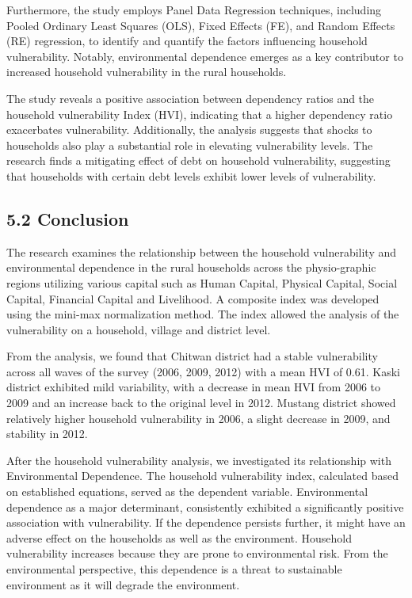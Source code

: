 Furthermore, the study employs Panel Data Regression techniques, including Pooled Ordinary Least Squares (OLS), Fixed Effects (FE), and Random Effects (RE) regression, to identify and quantify the factors influencing household vulnerability. Notably, environmental dependence emerges as a key contributor to increased household vulnerability in the rural households.

The study reveals a positive association between dependency ratios and the household vulnerability Index (HVI), indicating that a higher dependency ratio exacerbates vulnerability. Additionally, the analysis suggests that shocks to households also play a substantial role in elevating vulnerability levels. The research finds a mitigating effect of debt on household vulnerability, suggesting that households with certain debt levels exhibit lower levels of vulnerability. 


\subsection*{5.2 Conclusion}
\renewcommand{\thepage}{\arabic{page}}
The research examines the relationship between the household vulnerability and environmental dependence in the rural households across the physio-graphic regions utilizing various capital such as Human Capital, Physical Capital, Social Capital, Financial Capital and Livelihood. A composite index was developed using the mini-max normalization method. The index allowed the analysis of the vulnerability on a household, village and district level. 

From the analysis, we found that Chitwan district had a stable vulnerability across all waves of the survey (2006, 2009, 2012) with a mean HVI of 0.61. Kaski district exhibited mild variability, with a decrease in mean HVI from 2006 to 2009 and an increase back to the original level in 2012.
Mustang district showed relatively higher household vulnerability in 2006, a slight decrease in 2009, and stability in 2012. 

After the household vulnerability analysis, we investigated its relationship with Environmental Dependence. The household vulnerability index, calculated based on established equations, served as the dependent variable. Environmental dependence as a major determinant, consistently exhibited a significantly positive association with vulnerability. If the dependence persists further, it might have an adverse effect on the households as well as the environment. Household vulnerability increases because they are prone to environmental risk. From the environmental perspective, this dependence is a threat to sustainable environment as it will degrade the environment.


